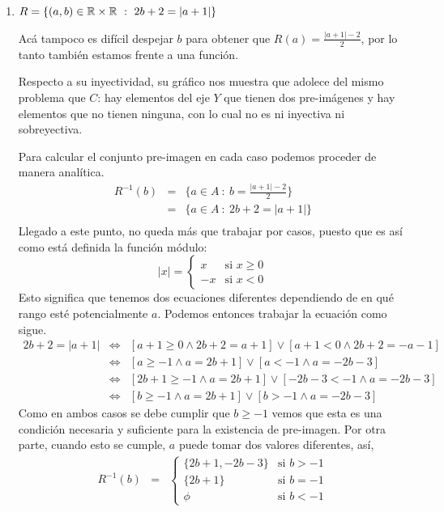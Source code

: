 \begin{ejemplo}
\begin{enumerate}
    \item[4)] $R=\{ (a,b)\in\R\times\R\ :\ 2b+2=|a+1|\}$
    
    Acá tampoco es difícil despejar $b$ para obtener que $R(a)=\frac{|a+1|-2}{2}$, por lo tanto también estamos frente a una función.
    
    Respecto a su inyectividad, su gráfico nos muestra que adolece del mismo problema que $C$: hay elementos del eje $Y$ que tienen dos pre-imágenes y hay elementos que no tienen ninguna, con lo cual no es ni inyectiva ni sobreyectiva.
    
    Para calcular el conjunto pre-imagen en cada caso podemos proceder de manera analítica.   
     \begin{eqnarray*}
      R^{-1}(b)&=& \{a\in A\ :\ b=\frac{|a+1|-2}{2}\}\\
      &=& \{a\in A\ :\ 2b+2=|a+1|\}\\
    \end{eqnarray*}   
    Llegado a este punto, no queda más que trabajar por casos, puesto que es así como está definida la función módulo:
  $$|x|=\left\{\begin{array}{rl} x&\textrm{si } x\ge 0\\ -x &\textrm{si }x<0\end{array}\right.$$
    Esto significa que tenemos dos ecuaciones diferentes dependiendo de en qué rango esté potencialmente $a$.
    Podemos entonces trabajar la ecuación como sigue.
     \begin{eqnarray*}
       2b+2=|a+1|&\Leftrightarrow& [a+1\ge 0\wedge 2b+2=a+1]\vee[a+1<0\wedge 2b+2=-a-1]\\
       &\Leftrightarrow& [a\ge -1\wedge a=2b+1]\vee[a<-1\wedge a=-2b-3]\\
       &\Leftrightarrow& [2b+1\ge -1\wedge a=2b+1]\vee[-2b-3<-1\wedge a=-2b-3]\\
       &\Leftrightarrow& [b\ge -1\wedge a=2b+1]\vee[b>-1\wedge a=-2b-3]
     \end{eqnarray*} 
Como en ambos casos se debe cumplir que $b\ge -1$ vemos que esta es una condición necesaria y suficiente para la existencia de pre-imagen.
Por otra parte, cuando esto se cumple, $a$ puede tomar dos valores diferentes, así,  
\begin{eqnarray*}
      R^{-1}(b)&=& \left\{\begin{array}{ll}
      \{2b+1, -2b-3\} &\textrm{si } b> -1\\
      \{2b+1\} &\textrm{si } b= -1\\
      \phi &\textrm{si } b< -1
      \end{array}\right.
    \end{eqnarray*}     
  \end{enumerate}
\end{ejemplo}

